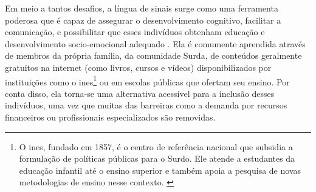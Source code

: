 Em meio a tantos desafios, a língua de sinais surge como uma ferramenta poderosa que é capaz de assegurar o desenvolvimento cognitivo, facilitar a comunicação, e possibilitar que esses indivíduos obtenham educação e desenvolvimento socio-emocional adequado \cite{who-2021-report-hearing}.
Ela é comumente aprendida através de membros da própria família, da comunidade Surda, de conteúdos geralmente gratuitos na internet (como livros, cursos e vídeos) disponibilizados por instituições como o \acrshort{ines}\footnote{
    O \acrfull{ines}, fundado em 1857, é o centro de referência nacional que subsidia a formulação de políticas públicas para o Surdo. Ele atende a estudantes da educação infantil até o ensino superior e também apoia a pesquisa de novas metodologias de ensino nesse contexto. \cite{mec-2021-conheca-ines}
} ou em escolas públicas que ofertam seu ensino.
Por conta disso, ela torna-se uma alternativa acessível para a inclusão desses indivíduos, uma vez que muitas das barreiras como a demanda por recursos financeiros ou profissionais especializados são removidas.




